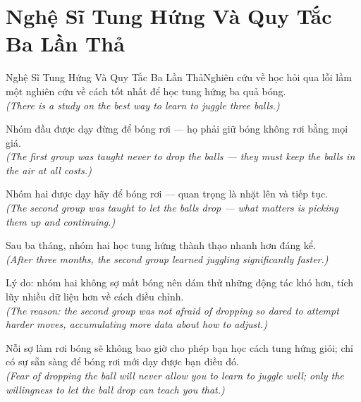 \section{Nghệ Sĩ Tung Hứng Và Quy Tắc Ba Lần Thả}
\begin{truyen}{Nghệ Sĩ Tung Hứng Và Quy Tắc Ba Lần Thả}{Nghiên cứu về học hỏi qua lỗi lầm}
 một nghiên cứu về cách tốt nhất để học tung hứng ba quả bóng.\\[4pt]
\textit{(There is a study on the best way to learn to juggle three balls.)}

Nhóm đầu được dạy đừng để bóng rơi --- họ phải giữ bóng không rơi bằng mọi giá.\\[4pt]
\textit{(The first group was taught never to drop the balls --- they must keep the balls in the air at all costs.)}

Nhóm hai được dạy hãy để bóng rơi --- quan trọng là nhặt lên và tiếp tục.\\[4pt]
\textit{(The second group was taught to let the balls drop --- what matters is picking them up and continuing.)}

Sau ba tháng, nhóm hai học tung hứng thành thạo nhanh hơn đáng kể.\\[4pt]
\textit{(After three months, the second group learned juggling significantly faster.)}

Lý do: nhóm hai không sợ mất bóng nên dám thử những động tác khó hơn, tích lũy nhiều dữ liệu hơn về cách điều chỉnh.\\[4pt]
\textit{(The reason: the second group was not afraid of dropping so dared to attempt harder moves, accumulating more data about how to adjust.)}

\end{truyen}
\begin{baihoc}
  Nỗi sợ làm rơi bóng sẽ không bao giờ cho phép bạn học cách tung hứng giỏi; chỉ có sự sẵn sàng để bóng rơi mới dạy được bạn điều đó.\\[4pt]
  \textit{(Fear of dropping the ball will never allow you to learn to juggle well; only the willingness to let the ball drop can teach you that.)}
\end{baihoc}

